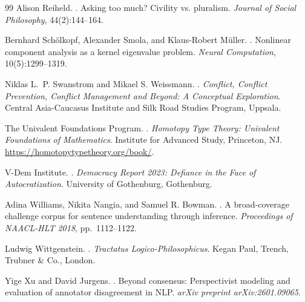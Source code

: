 \documentclass[12pt]{article}
\begin{document}
\begin{thebibliography}{99}
Alison Reiheld.
.
\newblock Asking too much? Civility vs. pluralism.
\newblock \emph{Journal of Social Philosophy}, 44(2):144--164.

Bernhard Sch\"{o}lkopf, Alexander Smola, and Klaus-Robert M\"{u}ller.
.
\newblock Nonlinear component analysis as a kernel eigenvalue problem.
\newblock \emph{Neural Computation}, 10(5):1299--1319.

Niklas L.~P. Swanstrom and Mikael S. Weissmann.
.
\newblock \emph{Conflict, Conflict Prevention, Conflict Management and Beyond: A Conceptual Exploration}.
\newblock Central Asia-Caucasus Institute and Silk Road Studies Program, Uppsala.

The Univalent Foundations Program.
.
\newblock \emph{Homotopy Type Theory: Univalent Foundations of Mathematics}.
\newblock Institute for Advanced Study, Princeton, NJ.
\newblock \url{https://homotopytypetheory.org/book/}.

V-Dem Institute.
.
\newblock \emph{Democracy Report 2023: Defiance in the Face of Autocratization}.
\newblock University of Gothenburg, Gothenburg.

Adina Williams, Nikita Nangia, and Samuel R. Bowman.
.
\newblock A broad-coverage challenge corpus for sentence understanding through inference.
\newblock \emph{Proceedings of NAACL-HLT 2018}, pp.~1112--1122.

Ludwig Wittgenstein.
.
\newblock \emph{Tractatus Logico-Philosophicus}.
\newblock Kegan Paul, Trench, Trubner \& Co., London.

Yige Xu and David Jurgens.
.
\newblock Beyond consensus: Perspectivist modeling and evaluation of annotator disagreement in NLP.
\newblock \emph{arXiv preprint arXiv:2601.09065}.

\end{thebibliography}

\newpage

\end{document}
